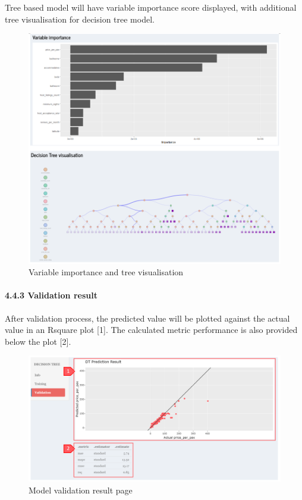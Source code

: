 \documentclass[
  12pt,
]{article}
\begin{document}
Tree based model will have variable importance score displayed, with
additional tree visualisation for decision tree model.

\begin{figure}[H]

{\centering \includegraphics[width=0.95\linewidth]{images/mdltrain6} 

}

\caption{Variable importance and tree visualisation}\label{fig:unnamed-chunk-23}
\end{figure}

\hypertarget{validation-result}{%
\paragraph{4.4.3 Validation result}\label{validation-result}}

After validation process, the predicted value will be plotted against
the actual value in an Rsquare plot {[}1{]}. The calculated metric
performance is also provided below the plot {[}2{]}.

\begin{figure}[H]

{\centering \includegraphics[width=0.95\linewidth]{images/mdltrain7} 

}

\caption{Model validation result page}\label{fig:unnamed-chunk-24}
\end{figure}
\end{document}
